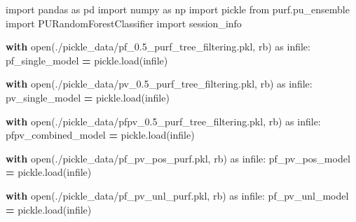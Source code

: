 \documentclass[
  11pt,
  oneside]{book}
\newenvironment{Shaded}{\begin{snugshade}}{\end{snugshade}}
\newcommand{\BuiltInTok}[1]{#1}
\newcommand{\ControlFlowTok}[1]{\textcolor[rgb]{0.13,0.29,0.53}{\textbf{#1}}}
\newcommand{\ImportTok}[1]{#1}
\newcommand{\NormalTok}[1]{#1}
\newcommand{\OperatorTok}[1]{\textcolor[rgb]{0.81,0.36,0.00}{\textbf{#1}}}
\newcommand{\StringTok}[1]{\textcolor[rgb]{0.31,0.60,0.02}{#1}}
\begin{document}
\begin{Shaded}
\begin{Highlighting}[]
\ImportTok{import}\NormalTok{ pandas }\ImportTok{as}\NormalTok{ pd}
\ImportTok{import}\NormalTok{ numpy }\ImportTok{as}\NormalTok{ np}
\ImportTok{import}\NormalTok{ pickle}
\ImportTok{from}\NormalTok{ purf.pu\_ensemble }\ImportTok{import}\NormalTok{ PURandomForestClassifier}
\ImportTok{import}\NormalTok{ session\_info}
\end{Highlighting}
\end{Shaded}

\begin{Shaded}
\begin{Highlighting}[]
\ControlFlowTok{with} \BuiltInTok{open}\NormalTok{(}\StringTok{\textquotesingle{}./pickle\_data/pf\_0.5\_purf\_tree\_filtering.pkl\textquotesingle{}}\NormalTok{, }\StringTok{\textquotesingle{}rb\textquotesingle{}}\NormalTok{) }\ImportTok{as}\NormalTok{ infile:}
\NormalTok{    pf\_single\_model }\OperatorTok{=}\NormalTok{ pickle.load(infile)}

\ControlFlowTok{with} \BuiltInTok{open}\NormalTok{(}\StringTok{\textquotesingle{}./pickle\_data/pv\_0.5\_purf\_tree\_filtering.pkl\textquotesingle{}}\NormalTok{, }\StringTok{\textquotesingle{}rb\textquotesingle{}}\NormalTok{) }\ImportTok{as}\NormalTok{ infile:}
\NormalTok{    pv\_single\_model }\OperatorTok{=}\NormalTok{ pickle.load(infile)}

\ControlFlowTok{with} \BuiltInTok{open}\NormalTok{(}\StringTok{\textquotesingle{}./pickle\_data/pfpv\_0.5\_purf\_tree\_filtering.pkl\textquotesingle{}}\NormalTok{, }\StringTok{\textquotesingle{}rb\textquotesingle{}}\NormalTok{) }\ImportTok{as}\NormalTok{ infile:}
\NormalTok{    pfpv\_combined\_model }\OperatorTok{=}\NormalTok{ pickle.load(infile)}
    
\ControlFlowTok{with} \BuiltInTok{open}\NormalTok{(}\StringTok{\textquotesingle{}./pickle\_data/pf\_pv\_pos\_purf.pkl\textquotesingle{}}\NormalTok{, }\StringTok{\textquotesingle{}rb\textquotesingle{}}\NormalTok{) }\ImportTok{as}\NormalTok{ infile:}
\NormalTok{    pf\_pv\_pos\_model }\OperatorTok{=}\NormalTok{ pickle.load(infile)}
    
\ControlFlowTok{with} \BuiltInTok{open}\NormalTok{(}\StringTok{\textquotesingle{}./pickle\_data/pf\_pv\_unl\_purf.pkl\textquotesingle{}}\NormalTok{, }\StringTok{\textquotesingle{}rb\textquotesingle{}}\NormalTok{) }\ImportTok{as}\NormalTok{ infile:}
\NormalTok{    pf\_pv\_unl\_model }\OperatorTok{=}\NormalTok{ pickle.load(infile)}
    

\end{Highlighting}
\end{Shaded}
\end{document}
